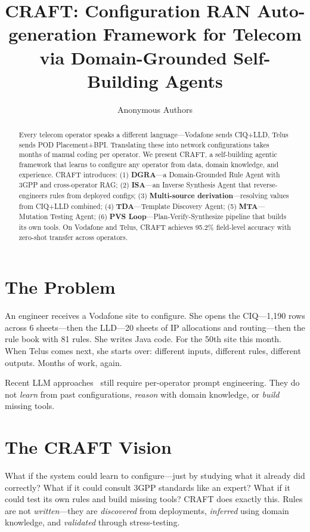 \documentclass[10pt]{article}
\title{\textbf{CRAFT: Configuration RAN Auto-generation Framework for Telecom via Domain-Grounded Self-Building Agents}}
\author{
	Anonymous Authors \\
}
\date{}
\begin{document}
	
	\maketitle
	
	\begin{abstract}
		Every telecom operator speaks a different language---Vodafone sends CIQ+LLD, Telus sends POD Placement+BPI. Translating these into network configurations takes months of manual coding per operator. We present CRAFT, a self-building agentic framework that learns to configure any operator from data, domain knowledge, and experience. CRAFT introduces: (1) \textbf{DGRA}---a Domain-Grounded Rule Agent with 3GPP and cross-operator RAG; (2) \textbf{ISA}---an Inverse Synthesis Agent that reverse-engineers rules from deployed configs; (3) \textbf{Multi-source derivation}---resolving values from CIQ+LLD combined; (4) \textbf{TDA}---Template Discovery Agent; (5) \textbf{MTA}---Mutation Testing Agent; (6) \textbf{PVS Loop}---Plan-Verify-Synthesize pipeline that builds its own tools. On Vodafone and Telus, CRAFT achieves 95.2\% field-level accuracy with zero-shot transfer across operators.
	\end{abstract}
	
	\section{The Problem}
	
	An engineer receives a Vodafone site to configure. She opens the CIQ---1,190 rows across 6 sheets---then the LLD---20 sheets of IP allocations and routing---then the rule book with 81 rules. She writes Java code. For the 50th site this month. When Telus comes next, she starts over: different inputs, different rules, different outputs. Months of work, again.
	
	Recent LLM approaches~\cite{lira2024largelanguagemodelszero,provvedi2026intentllm,wang2026llmpowered} still require per-operator prompt engineering. They do not \emph{learn} from past configurations, \emph{reason} with domain knowledge, or \emph{build} missing tools.
	
	\section{The CRAFT Vision}
	
	What if the system could learn to configure---just by studying what it already did correctly? What if it could consult 3GPP standards like an expert? What if it could test its own rules and build missing tools? CRAFT does exactly this. Rules are not \emph{written}---they are \emph{discovered} from deployments, \emph{inferred} using domain knowledge, and \emph{validated} through stress-testing.
	
\end{document}
